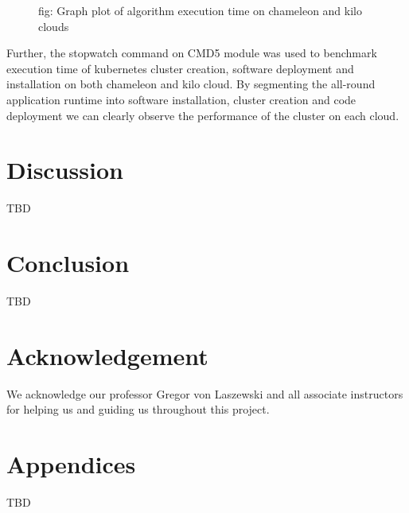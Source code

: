 \documentclass[9pt,twocolumn,twoside]{../../styles/osajnl}
\begin{document}
\begin{figure}[htbp]
\centering
{}
\caption{fig: Graph plot of algorithm execution time on chameleon and kilo clouds}
\label{fig: Graph plot of algorithm execution time on chameleon and kilo clouds}
\end{figure}

Further, the stopwatch command on CMD5 module was used to benchmark
execution time of kubernetes cluster creation, software deployment and
installation on both chameleon and kilo cloud. By segmenting the
all-round application runtime into software installation, cluster
creation and code deployment we can clearly observe the performance of
the cluster on each cloud.


\section{Discussion}
TBD

\section{Conclusion}

TBD

\section{Acknowledgement}

We acknowledge our professor Gregor von Laszewski and all associate
instructors for helping us and guiding us throughout this project.

\section{Appendices}
TBD


 
\end{document}
